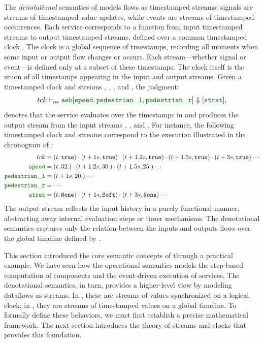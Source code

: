The \emph{denotational} semantics of \GRFRP models flows as timestamped streams: signals are streams
of timestamped value updates, while events are streams of timestamped occurrences. Each service
corresponds to a function from input timestamped streams to output timestamped streams, defined over
a common timestamped clock \tck. The clock \tck is a global sequence of timestamps,
recording all moments when some input or output flow changes or occurs. Each stream---whether signal
or event---is defined only at a subset of these timestamps. The clock itself is the union of all
timestamps appearing in the input and output streams.
%
Given a timestamped clock \tck and streams , , ,
and , the judgment:
\begin{equation*}
  \tck \vdashFrp \idf{aeb} [\idf{speed}, \idf{pedestrian\_l}, \idf{pedestrian\_r}] \Downarrow [\idf{strat}],
\end{equation*}
denotes that the  service evaluates over the timestamps in \tck and produces the
output stream  from the input streams , , and .
For instance, the following timestamped clock and streams correspond to the execution illustrated in
the chronogram of :
\begin{align*}
  \tck                & = (t, \true) \step (t+1s, \true) \step (t+1.2s, \true) \step (t+1.5s, \true) \step (t+3s, \true) \cdots \\
  \idf{speed}         & = (t, 32.) \step (t+1.2s, 30.) \step (t+1.5s, 25.) \cdots                                               \\
  \idf{pedestrian\_l} & = (t+1s, 20.) \cdots                                                                                    \\
  \idf{pedestrian\_r} & = \cdots                                                                                                \\
  \idf{strat}         & = (t, \No) \step (t+1s, \Soft) \step (t+3s, \No) \cdots
\end{align*}
The output stream  reflects the input history in a purely functional manner, abstracting away
internal evaluation steps or timer mechanisms. The denotational semantics captures only the relation
between the inputs and outputs flows over the global timeline defined by \tck.

This section introduced the core semantic concepts of \GRust through a practical example.
We have seen how the operational semantics models the step-based computation of \GRSync
components and the event-driven execution of \GRFRP services. The denotational semantics,
in turn, provides a higher-level view by modeling dataflows as streams. In \GRSync, these
are streams of values synchronized on a logical clock; in \GRFRP, they are streams of
timestamped values on a global timeline. To formally define these behaviors, we must first
establish a precise mathematical framework. The next section introduces the theory of
streams and clocks that provides this foundation.
